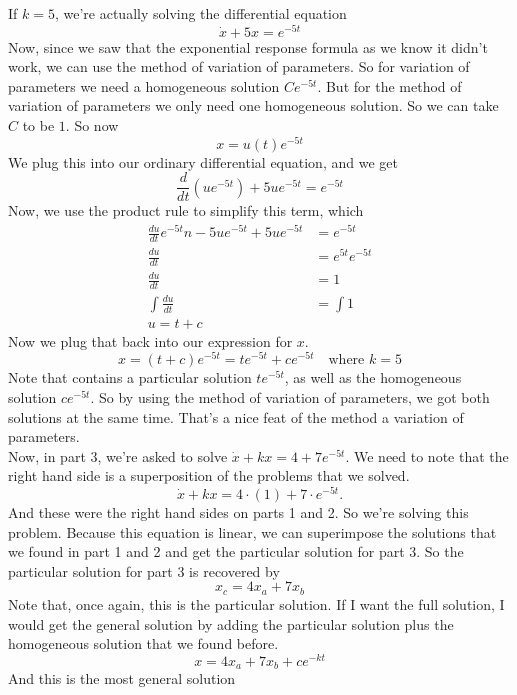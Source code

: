 If $k = 5$, we're actually solving the differential equation
\begin{equation*}
  \dot{x} + 5x = e^{-5t}
\end{equation*}
Now, since we saw that the exponential response formula as we know it didn't work,
we can use the method of variation of parameters.
So for variation of parameters we need a homogeneous solution $C e^{-5t}$.
But for the method of variation of parameters we only need one homogeneous solution.
So we can take $C$ to be $1$.
So now
\begin{equation*}
  x = u(t) e^{-5t}
\end{equation*}
We plug this into our ordinary differential equation, and we get 
\begin{equation*}
  \frac{d}{dt}(u e^{-5t}) + 5ue^{-5t} = e^{-5t}
\end{equation*}
Now, we use the product rule to simplify this term, which
\begin{align*}
  \frac{du}{dt} e^{-5t}n -5ue^{-5t} + 5u e^{-5t} &= e^{-5t} \\
  \frac{du}{dt} &= e^{5t} e^{-5t} \\
  \frac{du}{dt} &= 1 \\
  \int \frac{du}{dt} &= \int 1 \\
  u = t + c
\end{align*}
Now we plug that back into our expression for $x$.
\begin{equation*}
  x = (t+c)e^{-5t} = te^{-5t} + ce^{-5t} \quad \text{where } k = 5 
\end{equation*}
Note that contains a particular solution $te^{-5t}$, as well as the homogeneous solution
$ce^{-5t}$. 
So by using the method of variation of parameters, we got both solutions at the same time.
That's a nice feat of the method a variation of parameters. \\

Now, in part 3, we're asked to solve $\dot{x} + kx = 4 + 7 e^{-5t}$.
We need to note that the right hand side is a superposition of the problems that we solved.
\begin{equation*}
  \dot{x} + kx = 4\cdot (1) + 7 \cdot e^{-5t}.
\end{equation*}
And these were the right hand sides on parts 1 and 2.
So we're solving this problem.
Because this equation is linear, we can superimpose the solutions that we found in part 1 and 2
and get the particular solution for part 3.
So the particular solution for part 3 is recovered by
\begin{equation*}
  x_c = 4 x_a + 7 x_b  
\end{equation*}
Note that, once again, this is the particular solution.
If I want the full solution, I would get the general solution by adding the particular solution plus the homogeneous solution that we found before.
\begin{equation*}
  x = 4 x_a + 7 x_b + c e^{-kt}
\end{equation*}
And this is the most general solution
\clearpage

